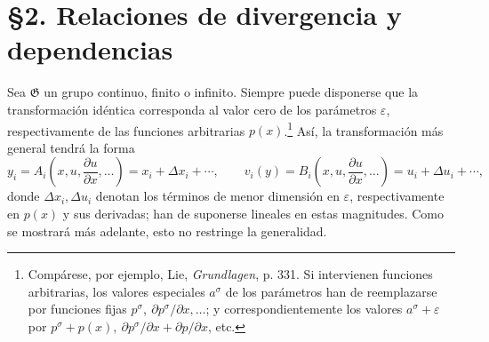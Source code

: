 \documentclass[11pt]{article}
\newcommand{\D}{\Delta}
\newcommand{\eps}{\varepsilon}
\providecommand{\G}{\mathfrak G}
\providecommand{\p}{\partial}
\begin{document}
\section*{\S{}2. Relaciones de divergencia y dependencias}

Sea \(\G\) un grupo continuo, finito o infinito. Siempre puede disponerse que la transformación idéntica corresponda al valor cero de los parámetros \(\eps\), respectivamente de las funciones arbitrarias \(p(x)\).\footnote{Compárese, por ejemplo, Lie, \emph{Grundlagen}, p. 331. Si intervienen funciones arbitrarias, los valores especiales \(a^\sigma\) de los parámetros han de reemplazarse por funciones fijas \(p^\sigma,\ \p p^\sigma/\p x,\ldots\); y correspondientemente los valores \(a^\sigma+\eps\) por \(p^\sigma+p(x),\ \p p^\sigma/\p x+\p p/\p x\), etc.} Así, la transformación más general tendrá la forma
\[
y_i=A_i\!\left(x,u,\frac{\p u}{\p x},\ldots\right)=x_i+\D x_i+\cdots,\qquad
v_i(y)=B_i\!\left(x,u,\frac{\p u}{\p x},\ldots\right)=u_i+\D u_i+\cdots,
\]
donde \(\D x_i,\D u_i\) denotan los términos de menor dimensión en \(\eps\), respectivamente en \(p(x)\) y sus derivadas; han de suponerse lineales en estas magnitudes. Como se mostrará más adelante, esto no restringe la generalidad.
\end{document}
